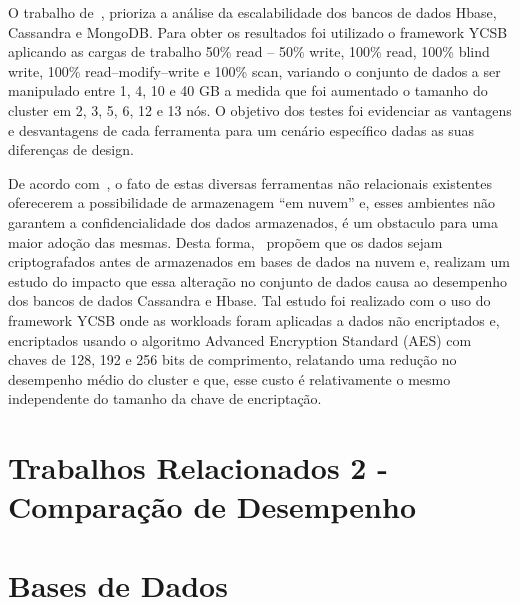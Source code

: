 \documentclass[a4paper,12pt,onecolumn,titlepage]{article}
\begin{document}
O trabalho de~\cite{swaminathan:2016}, prioriza a análise da escalabilidade dos bancos de dados Hbase, Cassandra e MongoDB. Para obter os resultados foi utilizado o framework YCSB aplicando as cargas de trabalho 50\% read – 50\% write, 100\% read, 100\% blind write, 100\% read–modify–write e 100\% scan, variando o conjunto de dados a ser manipulado entre 1, 4, 10 e 40 GB a medida que foi aumentado o tamanho do cluster em 2, 3, 5, 6, 12 e 13 nós. O objetivo dos testes foi evidenciar as vantagens e desvantagens de cada ferramenta para um cenário específico dadas as suas diferenças de design.

De acordo com~\cite{waage:2015}, o fato de estas diversas ferramentas não relacionais existentes oferecerem a possibilidade de armazenagem “em nuvem” e, esses ambientes não garantem a confidencialidade dos dados armazenados, é um obstaculo para uma maior adoção das mesmas. Desta forma,~\cite{waage:2015} propõem que os dados sejam criptografados antes de armazenados em bases de dados na nuvem e, realizam um estudo do impacto que essa alteração no conjunto de dados causa ao desempenho dos bancos de dados Cassandra e Hbase. Tal estudo foi realizado com o uso do framework YCSB onde as workloads foram aplicadas a dados não encriptados e, encriptados usando o algoritmo Advanced Encryption Standard (AES) com chaves de 128, 192 e 256 bits de comprimento, relatando uma redução no desempenho médio do cluster e que, esse custo é relativamente o mesmo independente do tamanho da chave de encriptação.

\section{Trabalhos Relacionados 2 - Comparação de Desempenho}
\label{sec:relacionados2}

\section{Bases de Dados}
\label{sec:bases}


\renewcommand{\refname}{Bibliografia}


\end{document}
